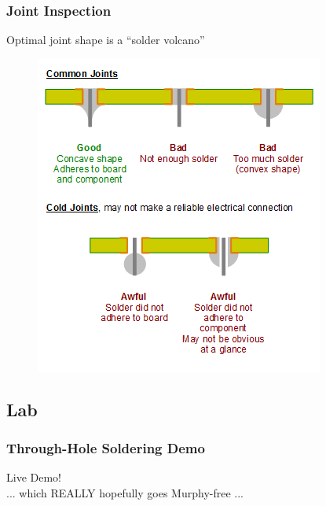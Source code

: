 \documentclass{beamer}
\begin{document}
\begin{frame}
\frametitle{Joint Inspection}
Optimal joint shape is a ``solder volcano''
\begin{figure}
\centering
\includegraphics[width=\textwidth,height=0.8\textheight,keepaspectratio]{images-dis1/solder-joints}
\end{figure}
\end{frame}

\subsection{Lab}
\begin{frame}
\frametitle{Through-Hole Soldering Demo}
\begin{center}
{\huge Live Demo!} \\
\vspace{20px}
{\tiny... which REALLY hopefully goes Murphy-free ...}
\end{center}
\end{frame}
\end{document}
